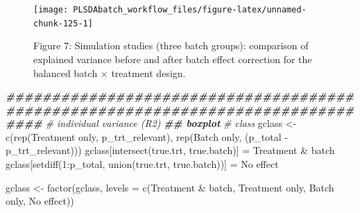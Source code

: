 \documentclass[
]{book}
\newenvironment{Shaded}{\begin{snugshade}}{\end{snugshade}}
\newcommand{\AttributeTok}[1]{\textcolor[rgb]{0.77,0.63,0.00}{#1}}
\newcommand{\CommentTok}[1]{\textcolor[rgb]{0.56,0.35,0.01}{\textit{#1}}}
\newcommand{\DecValTok}[1]{\textcolor[rgb]{0.00,0.00,0.81}{#1}}
\newcommand{\DocumentationTok}[1]{\textcolor[rgb]{0.56,0.35,0.01}{\textbf{\textit{#1}}}}
\newcommand{\FunctionTok}[1]{\textcolor[rgb]{0.00,0.00,0.00}{#1}}
\newcommand{\NormalTok}[1]{#1}
\newcommand{\OtherTok}[1]{\textcolor[rgb]{0.56,0.35,0.01}{#1}}
\newcommand{\SpecialCharTok}[1]{\textcolor[rgb]{0.00,0.00,0.00}{#1}}
\newcommand{\StringTok}[1]{\textcolor[rgb]{0.31,0.60,0.02}{#1}}
\begin{document}
\begin{figure}

{\centering \texttt{[image: PLSDAbatch\_workflow\_files/figure-latex/unnamed-chunk-125-1]} 

}

\caption{Figure 7: Simulation studies (three batch groups): comparison of explained variance before and after batch effect correction for the balanced batch × treatment design.}\label{fig:unnamed-chunk-125}
\end{figure}

\begin{Shaded}
\begin{Highlighting}[]
\DocumentationTok{\#\#\#\#\#\#\#\#\#\#\#\#\#\#\#\#\#\#\#\#\#\#\#\#\#\#\#\#\#\#\#\#\#\#\#\#\#\#\#\#\#\#\#\#\#\#\#\#\#\#\#\#\#\#\#\#\#\#\#\#\#\#\#\#\#\#\#\#\#\#\#\#\#\#\#\#\#\#\#\#}
\CommentTok{\# individual variance (R2)}
\DocumentationTok{\#\# boxplot}
\CommentTok{\# class}
\NormalTok{gclass }\OtherTok{\textless{}{-}} \FunctionTok{c}\NormalTok{(}\FunctionTok{rep}\NormalTok{(}\StringTok{\textquotesingle{}Treatment only\textquotesingle{}}\NormalTok{, p\_trt\_relevant), }
            \FunctionTok{rep}\NormalTok{(}\StringTok{\textquotesingle{}Batch only\textquotesingle{}}\NormalTok{, (p\_total }\SpecialCharTok{{-}}\NormalTok{ p\_trt\_relevant)))}
\NormalTok{gclass[}\FunctionTok{intersect}\NormalTok{(true.trt, true.batch)] }\OtherTok{=} \StringTok{\textquotesingle{}Treatment \& batch\textquotesingle{}}
\NormalTok{gclass[}\FunctionTok{setdiff}\NormalTok{(}\DecValTok{1}\SpecialCharTok{:}\NormalTok{p\_total, }\FunctionTok{union}\NormalTok{(true.trt, true.batch))] }\OtherTok{=} \StringTok{\textquotesingle{}No effect\textquotesingle{}}

\NormalTok{gclass }\OtherTok{\textless{}{-}} \FunctionTok{factor}\NormalTok{(gclass, }\AttributeTok{levels =} \FunctionTok{c}\NormalTok{(}\StringTok{\textquotesingle{}Treatment \& batch\textquotesingle{}}\NormalTok{, }
                                    \StringTok{\textquotesingle{}Treatment only\textquotesingle{}}\NormalTok{, }
                                    \StringTok{\textquotesingle{}Batch only\textquotesingle{}}\NormalTok{, }
                                    \StringTok{\textquotesingle{}No effect\textquotesingle{}}\NormalTok{))}


\end{Highlighting}
\end{Shaded}
\end{document}
